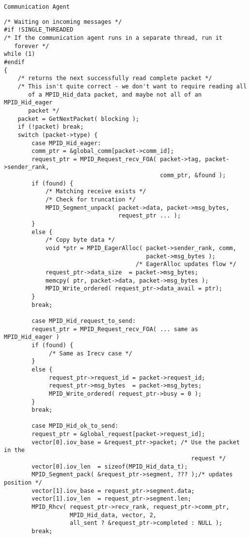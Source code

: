\texttt{Communication Agent}
\begin{verbatim}
/* Waiting on incoming messages */
#if !SINGLE_THREADED
/* If the communication agent runs in a separate thread, run it
   forever */
while (1) 
#endif
{
    /* returns the next successfully read complete packet */
    /* This isn't quite correct - we don't want to require reading all
       of a MPID_Hid_data packet, and maybe not all of an MPID_Hid_eager
       packet */
    packet = GetNextPacket( blocking );
    if (!packet) break;
    switch (packet->type) {
        case MPID_Hid_eager:
        comm_ptr = &global_comm[packet->comm_id];
        request_ptr = MPID_Request_recv_FOA( packet->tag, packet->sender_rank, 
                                             comm_ptr, &found );
        if (found) {
            /* Matching receive exists */
            /* Check for truncation */
            MPID_Segment_unpack( packet->data, packet->msg_bytes, 
                                 request_ptr ... );
        }
        else {
            /* Copy byte data */
            void *ptr = MPID_EagerAlloc( packet->sender_rank, comm, 
                                         packet->msg_bytes );
                                      /* EagerAlloc updates flow */
            request_ptr->data_size  = packet->msg_bytes;
            memcpy( ptr, packet->data, packet->msg_bytes );
            MPID_Write_ordered( request_ptr->data_avail = ptr);
        }
        break;

        case MPID_Hid_request_to_send:
        request_ptr = MPID_Request_recv_FOA( ... same as MPID_Hid_eager )
        if (found) {
             /* Same as Irecv case */
        }
        else {
             request_ptr->request_id = packet->request_id;
             request_ptr->msg_bytes  = packet->msg_bytes;
             MPID_Write_ordered( request_ptr->busy = 0 );
        }
        break;

        case MPID_Hid_ok_to_send:
        request_ptr = &global_request[packet->request_id];
        vector[0].iov_base = &request_ptr->packet; /* Use the packet in the 
                                                      request */
        vector[0].iov_len  = sizeof(MPID_Hid_data_t);
        MPID_Segment_pack( &request_ptr->segment, ??? );/* updates position */
        vector[1].iov_base = request_ptr->segment.data;
        vector[1].iov_len  = request_ptr->segment.len;
        MPID_Rhcv( request_ptr->recv_rank, request_ptr->comm_ptr, 
                   MPID_Hid_data, vector, 2, 
                   all_sent ? &request_ptr->completed : NULL );
        break;


\end{verbatim}
